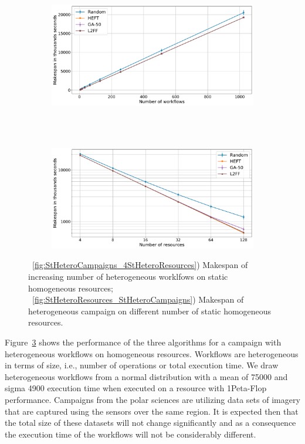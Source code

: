 \begin{figure}[ht!]
    \centering
    \begin{subfigure}[b]{0.85\textwidth}
        \includegraphics[width=.95\textwidth]{figures/campaign/StHeteroCampaigns_4StHomoResources.pdf}
        \caption{}
        \label{fig:StHeteroCampaigns_4StHomoResources}
    \end{subfigure}\\
    ~ 
    \begin{subfigure}[b]{0.85\textwidth}
        \includegraphics[width=.95\textwidth]{figures/campaign/HomogeResources_StHeteroCampaigns.pdf}
        \caption{}
        \label{fig:StHomoResources_StHeteroCampaigns}
    \end{subfigure}
    \caption{~\ref{fig:StHeteroCampaigns_4StHeteroResources}) Makespan of increasing number of heterogeneous worklfows on static homogeneous resources;
        ~\ref{fig:StHeteroResources_StHeteroCampaigns}) Makespan of heterogeneous campaign on different number of static homogeneous resources.}
    \label{fig:het_het_analysis}
\end{figure}

Figure~\ref{fig:het_het_analysis} shows the performance of the three algorithms for a campaign with heterogeneous workflows on homogeneous resources.
Workflows are heterogeneous in terms of size, i.e., number of operations or total execution time.
We draw heterogeneous workflows from a normal distribution with a mean of 75000 and sigma 4900 execution time when executed on a resource with 1Peta-Flop performance.
Campaigns from the polar sciences are utilizing  data sets of imagery that are captured using the sensors over the same region.
It is expected then that the total size of these datasets will not change significantly and as a consequence the execution time of the workflows will not be considerably different.

